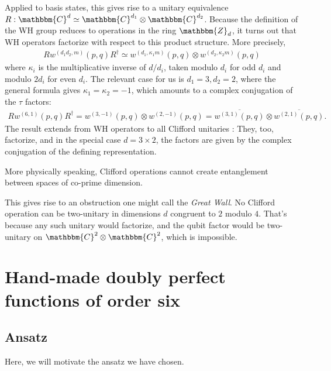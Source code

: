 \documentclass[aps,nofootinbib,floatfix,a4paper]{revtex4}
\newcommand{\1}{\mbox{$\mathbf{1}$}}
\def\ZZ{\mathbbm{Z}}
\def\CC{\mathbbm{C}}
\begin{document}
Applied to basis states, this gives rise to a unitary equivalence $R: \CC^{d}\simeq \CC^{d_1}\otimes \CC^{d_2}$.
Because the definition of the WH group reduces to operations in the ring $\ZZ_d$, it turns out 
\cite{gross2008culs,appleby2012monomial}
that WH operators factorize with respect to this product structure.
More precisely,
\begin{align}\label{eqn:chinese_wh}
	R w^{(d_1d_2,m)}(p,q) R^\dagger 
	\simeq 
	w^{(d_1,\kappa_1m)}(p,q) \otimes w^{(d_2,\kappa_2m)}(p,q)
\end{align}
where $\kappa_i$ is the multiplicative inverse of $d/d_i$, taken modulo $d_i$ for odd $d_i$ and modulo $2d_i$ for even $d_i$.
The relevant case for us is $d_1=3, d_2=2$, where the general formula gives $\kappa_1=\kappa_2=-1$, which amounts to a complex conjugation of the $\tau$ factors:
\begin{align*}
	R w^{(6,1)}(p,q) R^\dagger 
	=
	{ w^{(3,-1)}(p,q)}
	\otimes 
	{w^{(2,-1)}(p,q)}
	=
	\overline{ w^{(3,1)}(p,q)}
	\otimes 
	\overline{w^{(2,1)}(p,q)}
	.
\end{align*}
The result extends from WH operators to all Clifford unitaries \cite{gross2008culs,appleby2012monomial}:
They, too, factorize,
and in the special case $d=3\times2$,
the factors are given by the complex conjugation of the defining representation.

More physically speaking, Clifford operations cannot create entanglement between spaces of co-prime dimension.

This gives rise to an obstruction one might call the \emph{Great Wall}.
No Clifford operation can be two-unitary in dimensions $d$ congruent to $2$ modulo $4$.
That's because any such unitary would factorize, and the qubit factor would be two-unitary on $\CC^2\otimes \CC^2$,  which is impossible.

\section{Hand-made doubly perfect functions of order six}
\label{sec:handmade}

\subsection{Ansatz}
\label{sec:ansatz}

Here, we will motivate the ansatz we have chosen.
\end{document}
